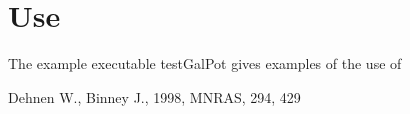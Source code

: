 \documentclass{article}
\begin{document}
\section{Use}
The example executable testGalPot gives examples of the use of 


\begin{thebibliography}{36}
 

{Dehnen} W., {Binney} J., 1998, MNRAS, 294, 429
 
\end{thebibliography}
 
\end{document}
